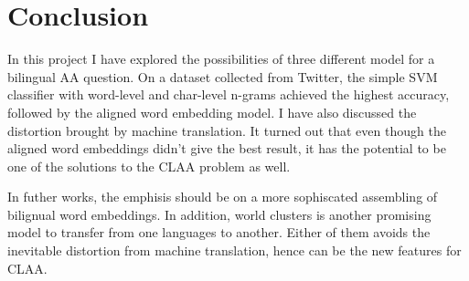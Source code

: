 \documentclass[11pt,a4paper]{article}
\begin{document}
\section{Conclusion}\label{sec:conclusion}

In this project I have explored the possibilities of three different model for a bilingual AA question. On a dataset collected from Twitter, the simple SVM classifier with word-level and char-level n-grams achieved the highest accuracy, followed by the aligned word embedding model. I have also discussed the distortion brought by machine translation. It turned out that even though the aligned word embeddings didn't give the best result, it has the potential to be one of the solutions to the CLAA problem as well.

In futher works, the emphisis should be on a more sophiscated assembling of bilignual word embeddings. In addition, world clusters \cite{tackstrom2012cross} is another promising model to transfer from one languages to another. Either of them avoids the inevitable distortion from machine translation, hence can be the new features for CLAA.



\end{document}
